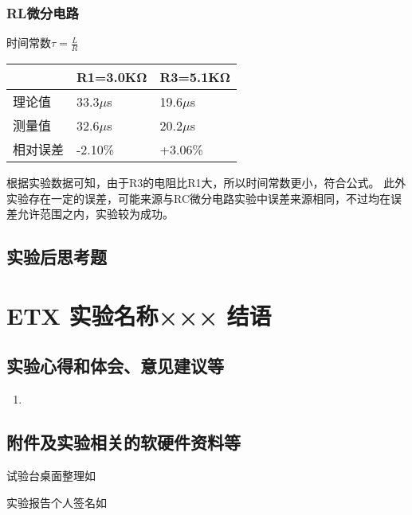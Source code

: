 \documentclass[dvipsnames, svgnames,a4paper,11pt]{article}
\begin{document}
	\subsubsection{RL微分电路}
	时间常数$\tau=\frac LR$
	\begin{table}[H]
		\centering
		\begin{tabular}{|l|l|l|}
		\hline
			~ & R1=3.0KΩ & R3=5.1KΩ \\ \hline
			理论值 & 33.3$\mu$s & 19.6$\mu$s \\ \hline
			测量值 & 32.6$\mu$s & 20.2$\mu$s \\ \hline
			相对误差 & -2.10\% & +3.06\% \\ \hline
		\end{tabular}
	\end{table}
	根据实验数据可知，由于R3的电阻比R1大，所以时间常数更小，符合公式。
	此外实验存在一定的误差，可能来源与RC微分电路实验中误差来源相同，不过均在误差允许范围之内，实验较为成功。
	\subsubsection{}
	
	
	\subsection{实验后思考题}
	
	\begin{question}
		
	\end{question}
	
	\begin{question}
		
	\end{question}
	
	\begin{question}
		
	\end{question}
	
	
	
	\clearpage
	
	\section{ETX 实验名称××× \quad\heiti 结语}
	
	\subsection{实验心得和体会、意见建议等}
	\begin{enumerate}
		\item 
	\end{enumerate}
	

	\subsection{附件及实验相关的软硬件资料等}
	试验台桌面整理如%
	
	实验报告个人签名如

	
	
\end{document}
